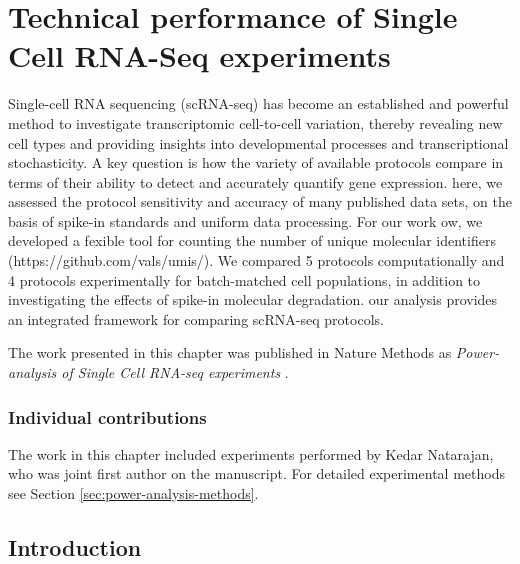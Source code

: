 
\chapter{Technical performance of Single Cell RNA-Seq experiments} \label{ch:power}

\graphicspath{{Chapter2/Figs/}}

Single-cell RNA sequencing (scRNA-seq) has become an established and powerful method to investigate transcriptomic cell-to-cell variation, thereby revealing new cell types
and providing insights into developmental processes and transcriptional stochasticity. A key question is how the variety of available protocols compare in terms of their ability to detect and accurately quantify gene expression. here, we assessed the protocol sensitivity and accuracy of many published data sets, on the basis of spike-in standards and uniform data processing. For our work ow, we developed a fexible tool for counting the number of unique molecular identifiers (https://github.com/vals/umis/). We compared  5 protocols computationally and 4 protocols experimentally for batch-matched cell populations, in addition to investigating the effects of spike-in molecular degradation. our analysis provides an integrated framework for comparing scRNA-seq protocols.

The work presented in this chapter was published in Nature Methods as \textit{Power-analysis of Single Cell RNA-seq experiments} \cite{Svensson2017-pf}.

\subsection*{Individual contributions}

The work in this chapter included experiments performed by Kedar Natarajan, who was joint first author on the manuscript. For detailed experimental methods see Section \ref{sec:power-analysis-methods}.

\section{Introduction}

